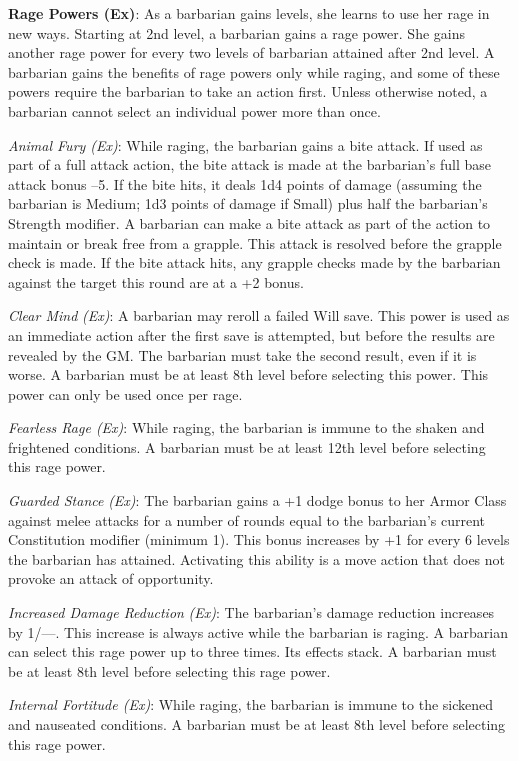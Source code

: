 \textbf{Rage Powers (Ex)}: As a barbarian gains levels, she learns to use her rage in new ways. Starting at 2nd level, a barbarian gains a rage power. She gains another rage power for every two levels of barbarian attained after 2nd level. A barbarian gains the benefits of rage powers only while raging, and some of these powers require the barbarian to take an action first. Unless otherwise noted, a barbarian cannot select an individual power more than once.
				
\textit{Animal Fury (Ex)}: While raging, the barbarian gains a bite attack. If used as part of a full attack action, the bite attack is made at the barbarian's full base attack bonus --5. If the bite hits, it deals 1d4 points of damage (assuming the barbarian is Medium; 1d3 points of damage if Small) plus half the barbarian's Strength modifier. A barbarian can make a bite attack as part of the action to maintain or break free from a grapple. This attack is resolved before the grapple check is made. If the bite attack hits, any grapple checks made by the barbarian against the target this round are at a +2 bonus.
				
\textit{Clear Mind} \textit{(Ex)}: A barbarian may reroll a failed Will save. This power is used as an immediate action after the first save is attempted, but before the results are revealed by the GM. The barbarian must take the second result, even if it is worse. A barbarian must be at least 8th level before selecting this power. This power can only be used once per rage.
				
\textit{Fearless Rage (Ex)}: While raging, the barbarian is immune to the shaken and frightened conditions. A barbarian must be at least 12th level before selecting this rage power.
				
\textit{Guarded Stance} \textit{(Ex)}: The barbarian gains a +1 dodge bonus to her Armor Class against melee attacks for a number of rounds equal to the barbarian's current Constitution modifier (minimum 1). This bonus increases by +1 for every 6 levels the barbarian has attained. Activating this ability is a move action that does not provoke an attack of opportunity.
				
\textit{Increased Damage Reduction} \textit{(Ex)}: The barbarian's damage reduction increases by 1/---. This increase is always active while the barbarian is raging. A barbarian can select this rage power up to three times. Its effects stack. A barbarian must be at least 8th level before selecting this rage power.
				
\textit{Internal Fortitude (Ex)}: While raging, the barbarian is immune to the sickened and nauseated conditions. A barbarian must be at least 8th level before selecting this rage power.
				
